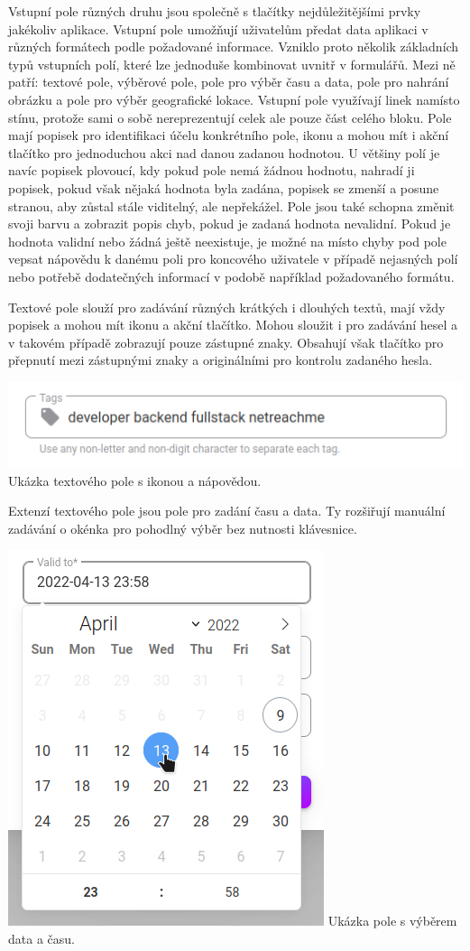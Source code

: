 			Vstupní pole různých druhu jsou společně s tlačítky nejdůležitějšími prvky jakékoliv aplikace.
			Vstupní pole umožňují uživatelům předat data aplikaci v různých formátech podle požadované informace.
			Vzniklo proto několik základních typů vstupních polí, které lze jednoduše kombinovat uvnitř v formulářů.
			Mezi ně patří: textové pole, výběrové pole, pole pro výběr času a data, pole pro nahrání obrázku a pole pro
			výběr geografické lokace.
			Vstupní pole využívají linek namísto stínu, protože sami o sobě nereprezentují celek ale pouze část celého
			bloku.
			Pole mají popisek pro identifikaci účelu konkrétního pole, ikonu a mohou mít i akční tlačítko pro jednoduchou
			akci nad danou zadanou hodnotou.
			U většiny polí je navíc popisek plovoucí, kdy pokud pole nemá žádnou hodnotu, nahradí ji popisek, pokud však
			nějaká hodnota byla zadána, popisek se zmenší a posune stranou, aby zůstal stále viditelný, ale nepřekážel.
			Pole jsou také schopna změnit svoji barvu a zobrazit popis chyb, pokud je zadaná hodnota nevalidní.
			Pokud je hodnota validní nebo žádná ještě neexistuje, je možné na místo chyby pod pole vepsat nápovědu k danému
			poli pro koncového uživatele v případě nejasných polí nebo potřebě dodatečných informací v podobě například
			požadovaného formátu.

			Textové pole slouží pro zadávání různých krátkých i dlouhých textů, mají vždy popisek a mohou mít ikonu a
			akční tlačítko.
			Mohou sloužit i pro zadávání hesel a v takovém případě zobrazují pouze zástupné znaky.
			Obsahují však tlačítko pro přepnutí mezi zástupnými znaky a originálními pro kontrolu zadaného hesla.

			\includegraphics[width=0.24\linewidth]{obrazky/textove_pole}\hfill
			Ukázka textového pole s ikonou a nápovědou. %

			Extenzí textového pole jsou pole pro zadání času a data.
			Ty rozšiřují manuální zadávání o okénka pro pohodlný výběr bez nutnosti klávesnice.

			\includegraphics[width=0.24\linewidth]{obrazky/datumove_pole}\hfill
			Ukázka pole s výběrem data a času. %

